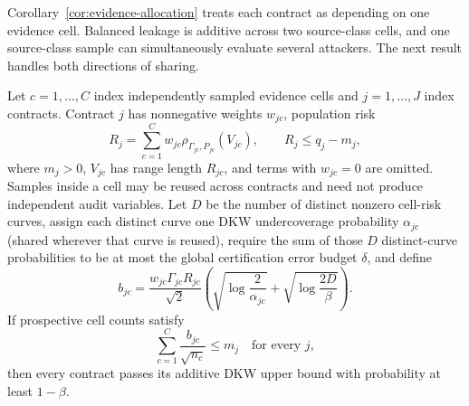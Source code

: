 Corollary~\ref{cor:evidence-allocation} treats each contract as depending on one
evidence cell. Balanced leakage is additive across two source-class cells, and
one source-class sample can simultaneously evaluate several attackers. The next
result handles both directions of sharing.

\begin{theorem}
\label{thm:additive-allocation}
Let $c=1,\ldots,C$ index independently sampled evidence cells and
$j=1,\ldots,J$ index contracts. Contract $j$ has nonnegative weights $w_{jc}$,
population risk
\begin{equation}
 R_j=\sum_{c=1}^C w_{jc}\rho_{\Gamma_{jc},P_{jc}}(V_{jc}),
 \qquad R_j\leq q_j-m_j,
 \label{eq:additive-contract}
\end{equation}
where $m_j>0$, $V_{jc}$ has range length $R_{jc}$, and terms with
$w_{jc}=0$ are omitted. Samples inside a cell may be reused across contracts and
need not produce independent audit variables. Let $D$ be the number of distinct
nonzero cell-risk curves, assign each distinct curve one DKW undercoverage
probability $\alpha_{jc}$ (shared wherever that curve is reused), require the
sum of those $D$ distinct-curve probabilities to be at most the global
certification error budget $\delta$, and define
\begin{equation}
 b_{jc}=\frac{w_{jc}\Gamma_{jc}R_{jc}}{\sqrt{2}}
 \left(
   \sqrt{\log\frac{2}{\alpha_{jc}}}
   +\sqrt{\log\frac{2D}{\beta}}
 \right).
 \label{eq:additive-coefficient}
\end{equation}
If prospective cell counts satisfy
\begin{equation}
 \sum_{c=1}^C\frac{b_{jc}}{\sqrt{n_c}}\leq m_j
 \quad\text{for every }j,
 \label{eq:additive-power-condition}
\end{equation}
then every contract passes its additive DKW upper bound with probability at
least $1-\beta$.


\end{theorem}
